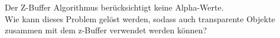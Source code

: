 \documentclass[../../main.tex]{subfiles}
\begin{document}
Der Z-Buffer Algorithmus berücksichtigt keine Alpha-Werte.\\
Wie kann dieses Problem gelöst werden, sodass auch transparente Objekte zusammen mit dem z-Buffer verwendet werden können?
\end{document}

